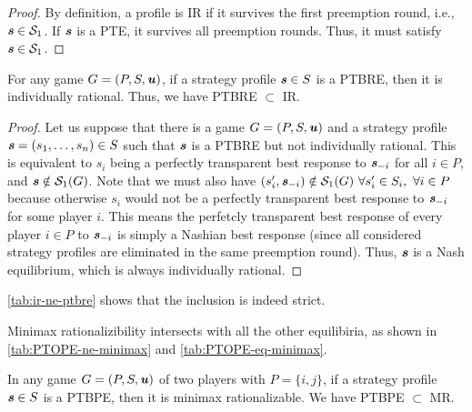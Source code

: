 \begin{proof}
	By definition, a profile is IR if it survives the first preemption round, i.e., $\boldsymbol{\mathit{s}} \in \mathcal{S}_1$.
	If $\boldsymbol{\mathit{s}}$ is a PTE, it survives all preemption rounds.
	Thus, it must satisfy $\boldsymbol{\mathit{s}} \in \mathcal{S}_1$.
\end{proof}

\begin{lemma}
	\label{th:ptbre-subset-ir}
	For any game $G = (P, S, \boldsymbol{\mathit{u}})$, if a strategy profile $\boldsymbol{\mathit{s}} \in S$ is a PTBRE, then it is individually rational.
	Thus, we have PTBRE $\subset$ IR.
\end{lemma}

\begin{proof}
	Let us suppose that there is a game $G = (P, S, \boldsymbol{\mathit{u}})$ and a strategy profile $\boldsymbol{\mathit{s}} = (s_1, \dots, s_n) \in S$ such that $\boldsymbol{\mathit{s}}$ is a PTBRE but not individually rational.
	This is equivalent to $s_i$ being a perfectly transparent best response to $\boldsymbol{\mathit{s}}_{-i}$ for all $i \in P$, and $\boldsymbol{\mathit{s}} \notin \mathcal{S}_1(G)$.
	Note that we must also have $(s_i', \boldsymbol{\mathit{s}}_{-i}) \notin \mathcal{S}_1(G)\ \forall s_i' \in S_i,\ \forall i \in P$ because otherwise $s_i$ would not be a perfectly transparent best response to $\boldsymbol{\mathit{s}}_{-i}$ for some player $i$.
	This means the perfetcly transparent best response of every player $i \in P$ to $\boldsymbol{\mathit{s}}_{-i}$ is simply a Nashian best response (since all considered strategy profiles are eliminated in the same preemption round).
	Thus, $\boldsymbol{\mathit{s}}$ is a Nash equilibrium, which is always individually rational.
\end{proof}

\begin{remark}
	\autoref{tab:ir-ne-ptbre} shows that the inclusion is indeed strict.
\end{remark}

Minimax rationalizibility intersects with all the other equilibiria, as shown in \autoref{tab:PTOPE-ne-minimax} and \autoref{tab:PTOPE-eq-minimax}.

\begin{lemma}
	\label{th:ptbpe-subset-mr}
	In any game $G = (P, S, \boldsymbol{\mathit{u}})$ of two players with $P = \{i, j\}$, if a strategy profile $\boldsymbol{\mathit{s}} \in S$ is a PTBPE, then it is minimax rationalizable.
	We have PTBPE $\subset$ MR.
\end{lemma}

